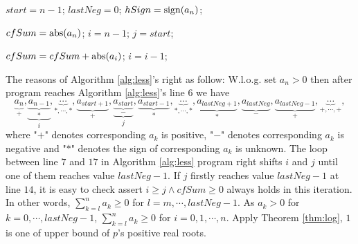 \begin{algorithm}
\caption{\less \label{alg:less}}
\DontPrintSemicolon
{}

$start=n-1$;
$lastNeg=0$;
$hSign={\rm sign}(a_n)$;\;


$cfSum={\rm abs}(a_n)$;
$i=n-1$;
$j=start$;\;
{
	{

	 $cfSum=cfSum+{\rm abs}(a_i)$;
	 $i=i-1$;\;

	}
}

\end{algorithm}
The reasons of Algorithm \ref{alg:less}'s right as follow: 
W.l.o.g. set $a_n>0$ then after program reaches Algorithm \ref{alg:less}'s line $6$ we have \[\underbrace{a_n}_{+},\underbrace{\underbrace{a_{n-1}}_{*}}_{i},\underbrace{\cdots}_{*,\cdots,*},\underbrace{a_{start+1}}_{+},\underbrace{\underbrace{a_{start}}_{-}}_{j},\underbrace{a_{start-1}}_{*},\underbrace{\cdots}_{*,\cdots,*},\underbrace{a_{lastNeg+1}}_{*},\underbrace{a_{lastNeg}}_{-},\underbrace{a_{lastNeg-1}}_{+},\underbrace{\cdots}_{+,\cdots,+},\]
where "$+$" denotes corresponding $a_k$ is positive, "$-$" denotes corresponding $a_k$ is negative and "$*$" denotes the sign of 
corresponding $a_k$ is unknown.
The loop between line $7$ and $17$ in Algorithm \ref{alg:less} program right shifts $i$ and $j$ until one of them reaches value $lastNeg-1$. If $j$ firstly  reaches value $lastNeg-1$ at line $14$,  it is easy to check assert $i\ge j\wedge cfSum\ge 0$ always holds in this iteration. In other words, $\sum_{k=l}^na_k\ge 0$ for $l=m,\cdots,lastNeg-1$. As $a_{k}>0$ for $k=0,\cdots, lastNeg-1$, $\sum_{k=l}^na_k\ge 0$ for $i=0,1,\cdots, n$. Apply Theorem  \ref{thm:log},  $1$ is one of upper bound  of $p$'s positive real roots.


